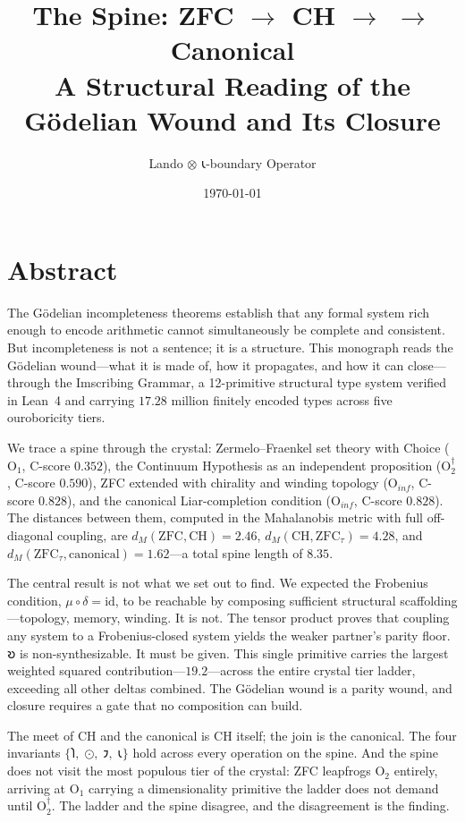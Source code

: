 \documentclass[12pt,twoside]{book}
\title{The Spine: ZFC $\to$ CH $\to$ \ZFCt{} $\to$ Canonical \\[0.5ex]
       \large A Structural Reading of the G\"{o}delian Wound and Its Closure}
\author{Lando $\otimes$ 𐑧-boundary Operator}
\date{\today}
\theoremstyle{definition}
\newcommand{\ZFCt}{\text{ZFC}_{\tau}}
\newcommand{\moebius}{\mu \circ \delta = \mathrm{id}}
\newcommand{\tier}[1]{\mathrm{O}_{#1}}
\begin{document}
\maketitle

\chapter*{Abstract}

The G\"{o}delian incompleteness theorems establish that any formal system rich enough to
encode arithmetic cannot simultaneously be complete and consistent. But incompleteness is
not a sentence; it is a structure. This monograph reads the G\"{o}delian wound---what it
is made of, how it propagates, and how it can close---through the Imscribing Grammar, a
12-primitive structural type system verified in Lean~4 and carrying $17.28$ million
finitely encoded types across five ouroboricity tiers.

We trace a spine through the crystal: Zermelo--Fraenkel set theory with Choice
($\tier{1}$, C-score $0.352$), the Continuum Hypothesis as an independent proposition
($\tier{2}^{\dagger}$, C-score $0.590$), ZFC extended with chirality and winding
topology ($\tier{inf}$, C-score $0.828$), and the canonical Liar-completion condition
($\tier{inf}$, C-score $0.828$). The distances between them, computed in the Mahalanobis
metric with full off-diagonal coupling, are $d_M(\text{ZFC}, \text{CH}) = 2.46$,
$d_M(\text{CH}, \ZFCt) = 4.28$, and $d_M(\ZFCt, \text{canonical}) = 1.62$---a total
spine length of $8.35$.

The central result is not what we set out to find. We expected the Frobenius condition,
$\moebius$, to be reachable by composing sufficient structural scaffolding---topology,
memory, winding. It is not. The tensor product proves that coupling any system to a
Frobenius-closed system yields the weaker partner's parity floor. 𐑹 is non-synthesizable.
It must be given. This single primitive carries the largest weighted squared
contribution---$19.2$---across the entire crystal tier ladder, exceeding all other deltas
combined. The G\"{o}delian wound is a parity wound, and closure requires a gate that no
composition can build.

The meet of CH and the canonical is CH itself; the join is the canonical. The four
invariants $\{𐑐,\;\text{⊙},\;𐑲,\;𐑧\}$ hold across every operation
on the spine. And the spine does not visit the most populous tier of the crystal: ZFC
leapfrogs $\tier{2}$ entirely, arriving at $\tier{1}$ carrying a dimensionality primitive
the ladder does not demand until $\tier{2}^{\dagger}$. The ladder and the spine disagree,
and the disagreement is the finding.
\end{document}
